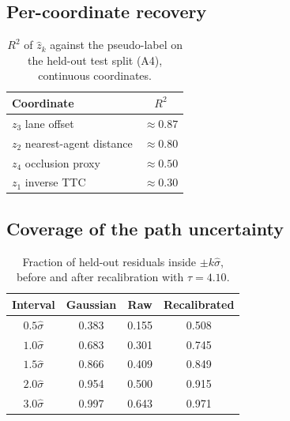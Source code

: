 \documentclass[conference]{IEEEtran}
\newcommand{\sighat}{\hat{\sigma}}
\begin{document}
\appendix
\renewcommand{\thetable}{A\arabic{table}}
\renewcommand{\thefigure}{A\arabic{figure}}
\renewcommand{\theHtable}{A\arabic{table}}
\renewcommand{\theHfigure}{A\arabic{figure}}
\setcounter{table}{0}
\setcounter{figure}{0}

\subsection{Per-coordinate recovery}

\begin{table}[H]
\centering
\caption{$R^2$ of $\hat z_k$ against the pseudo-label on the held-out test split
(A4), continuous coordinates.}
\label{tab:r2}
\footnotesize
\begin{tabular}{@{}l c@{}}
\toprule
Coordinate & $R^2$ \\
\midrule
$z_3$ lane offset & $\approx0.87$ \\
$z_2$ nearest-agent distance & $\approx0.80$ \\
$z_4$ occlusion proxy & $\approx0.50$ \\
$z_1$ inverse TTC & $\approx0.30$ \\
\bottomrule
\end{tabular}
\end{table}

\subsection{Coverage of the path uncertainty}

\begin{table}[H]
\centering
\caption{Fraction of held-out residuals inside $\pm k\sighat$, before and after
recalibration with $\tau=4.10$.}
\label{tab:coverage}
\footnotesize
\begin{tabular}{@{}c c c c@{}}
\toprule
Interval & Gaussian & Raw & Recalibrated \\
\midrule
$0.5\sighat$ & 0.383 & 0.155 & 0.508 \\
$1.0\sighat$ & 0.683 & 0.301 & 0.745 \\
$1.5\sighat$ & 0.866 & 0.409 & 0.849 \\
$2.0\sighat$ & 0.954 & 0.500 & 0.915 \\
$3.0\sighat$ & 0.997 & 0.643 & 0.971 \\
\bottomrule
\end{tabular}
\end{table}
\end{document}
